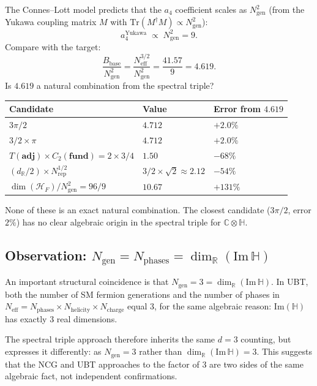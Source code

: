 \documentclass[11pt,a4paper]{article}
\theoremstyle{definition}
\theoremstyle{remark}
\begin{document}
The Connes--Lott model predicts that the $a_4$ coefficient scales as
$N_{\mathrm{gen}}^2$ (from the Yukawa coupling matrix $M$ with
$\mathrm{Tr}(M^\dagger M) \propto N_{\mathrm{gen}}^2$):
\begin{equation}
  a_4^{\mathrm{Yukawa}} \;\propto\; N_{\mathrm{gen}}^2 = 9.
  \label{eq:a4_Yukawa}
\end{equation}
Compare with the target:
\begin{equation}
  \frac{B_{\mathrm{base}}}{N_{\mathrm{gen}}^2}
  = \frac{N_{\mathrm{eff}}^{3/2}}{N_{\mathrm{gen}}^2}
  = \frac{41.57}{9}
  = 4.619.
  \label{eq:ratio_Ngen_Neff}
\end{equation}
Is $4.619$ a natural combination from the spectral triple?
\begin{center}
\begin{tabular}{lll}
  \toprule
  Candidate & Value & Error from $4.619$ \\
  \midrule
  $3\pi/2$ & $4.712$ & $+2.0\%$ \\
  $3/2 \times \pi$ & $4.712$ & $+2.0\%$ \\
  $T(\mathbf{adj}) \times C_2(\mathbf{fund}) = 2 \times 3/4$ & $1.50$ & $-68\%$ \\
  $(d_\mathbb{R}/2) \times N_{\mathrm{rep}}^{1/2}$ & $3/2 \times \sqrt{2} \approx 2.12$ & $-54\%$ \\
  $\dim(\mathcal{H}_F)/N_{\mathrm{gen}}^2 = 96/9$ & $10.67$ & $+131\%$ \\
  \bottomrule
\end{tabular}
\end{center}
None of these is an exact natural combination.
The closest candidate ($3\pi/2$, error $2\%$) has no clear algebraic
origin in the spectral triple for $\mathbb{C}\otimes\mathbb{H}$.

\subsection{Observation: $N_{\mathrm{gen}} = N_{\mathrm{phases}} = \dim_\mathbb{R}(\mathrm{Im}\,\mathbb{H})$}

An important structural coincidence is that $N_{\mathrm{gen}} = 3 = \dim_\mathbb{R}(\mathrm{Im}\,\mathbb{H})$.
In UBT, both the number of SM fermion generations and the number of phases in
$N_{\mathrm{eff}} = N_{\mathrm{phases}} \times N_{\mathrm{helicity}} \times N_{\mathrm{charge}}$
equal 3, for the same algebraic reason: $\mathrm{Im}(\mathbb{H})$ has exactly 3
real dimensions.

The spectral triple approach therefore inherits the same $d = 3$ counting,
but expresses it differently: as $N_{\mathrm{gen}} = 3$ rather than
$\dim_\mathbb{R}(\mathrm{Im}\,\mathbb{H}) = 3$.
This suggests that the NCG and UBT approaches to the factor of 3 are two
sides of the same algebraic fact, not independent confirmations.
\end{document}
